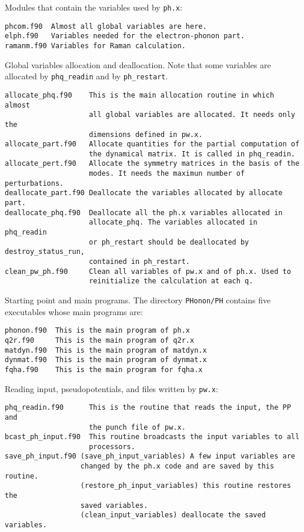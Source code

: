 \documentclass[12pt,a4paper]{article}
\def\phx{\texttt{ph.x}}
\begin{document}
Modules that contain the variables used by \phx:

\begin{verbatim}
phcom.f90  Almost all global variables are here.
elph.f90   Variables needed for the electron-phonon part.
ramanm.f90 Variables for Raman calculation.

\end{verbatim}

Global variables allocation and deallocation. Note that some
variables are allocated by \texttt{phq\_readin} and by \texttt{ph\_restart}.

\begin{verbatim}
allocate_phq.f90    This is the main allocation routine in which almost 
                    all global variables are allocated. It needs only the 
                    dimensions defined in pw.x.
allocate_part.f90   Allocate quantities for the partial computation of
                    the dynamical matrix. It is called in phq_readin.          
allocate_pert.f90   Allocate the symmetry matrices in the basis of the 
                    modes. It needs the maximun number of perturbations.              
deallocate_part.f90 Deallocate the variables allocated by allocate part.
deallocate_phq.f90  Deallocate all the ph.x variables allocated in 
                    allocate_phq. The variables allocated in phq_readin
                    or ph_restart should be deallocated by destroy_status_run,
                    contained in ph_restart.       
clean_pw_ph.f90     Clean all variables of pw.x and of ph.x. Used to 
                    reinitialize the calculation at each q.               
\end{verbatim}

Starting point and main programs. The directory \texttt{PHonon/PH} contains 
five executables whose main programs are:

\begin{verbatim}
phonon.f90  This is the main program of ph.x
q2r.f90     This is the main program of q2r.x
matdyn.f90  This is the main program of matdyn.x
dynmat.f90  This is the main program of dynmat.x
fqha.f90    This is the main program for fqha.x                      
\end{verbatim}

Reading input, pseudopotentials, and files written by \texttt{pw.x}:

\begin{verbatim}
phq_readin.f90      This is the routine that reads the input, the PP and
                    the punch file of pw.x.
bcast_ph_input.f90  This routine broadcasts the input variables to all
                    processors.
save_ph_input.f90 (save_ph_input_variables) A few input variables are 
                  changed by the ph.x code and are saved by this routine.
                  (restore_ph_input_variables) this routine restores the
                  saved variables.
                  (clean_input_variables) deallocate the saved variables.
\end{verbatim}
\end{document}
